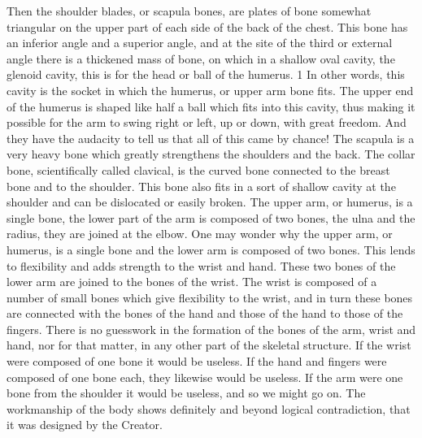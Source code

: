 Then the shoulder blades, or scapula bones, are plates of bone somewhat triangular on the
upper part of each side of the back of the chest. This bone has an inferior angle and a superior
angle, and at the site of the third or external angle there is a thickened mass of bone, on
which in a shallow oval cavity, the glenoid cavity, this is for the head or ball of the humerus.
1 In other words, this cavity is the socket in which the humerus, or upper arm bone fits. The
upper end of the humerus is shaped like half a ball which fits into this cavity, thus making it
possible for the arm to swing right or left, up or down, with great freedom. And they have the
audacity to tell us that all of this came by chance! The scapula is a very heavy bone which
greatly strengthens the shoulders and the back. The collar bone, scientifically called clavical,
is the curved bone connected to the breast bone and to the shoulder. This bone also fits in a
sort of shallow cavity at the shoulder and can be dislocated or easily broken. The upper arm,
or humerus, is a single bone, the lower part of the arm is composed of two bones, the ulna
and the radius, they are joined at the elbow. One may wonder why the upper arm, or
humerus, is a single bone and the lower arm is composed of two bones. This lends to
flexibility and adds strength to the wrist and hand. These two bones of the lower arm are
joined to the bones of the wrist. The wrist is composed of a number of small bones which
give flexibility to the wrist, and in turn these bones are connected with the bones of the hand
and those of the hand to those of the fingers. There is no guesswork in the formation of the
bones of the arm, wrist and hand, nor for that matter, in any other part of the skeletal
structure. If the wrist were composed of one bone it would be useless. If the hand and fingers
were composed of one bone each, they likewise would be useless. If the arm were one bone
from the shoulder it would be useless, and so we might go on. The workmanship of the body
shows definitely and beyond logical contradiction, that it was designed by the Creator.

